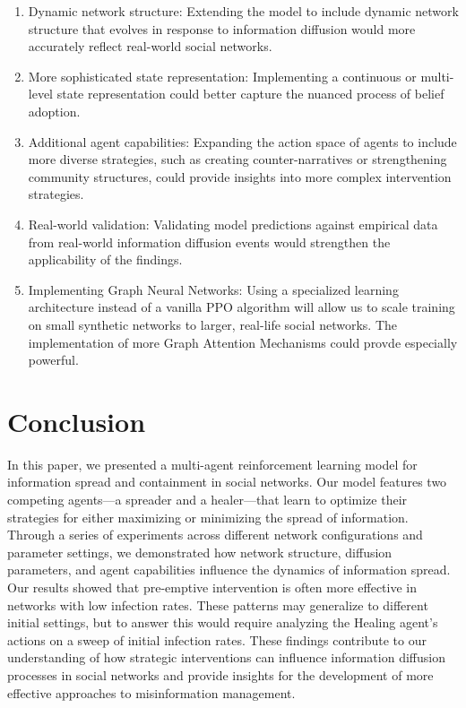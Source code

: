 \documentclass[12pt]{article}
\begin{document}
\begin{enumerate}
    \item Dynamic network structure: Extending the model to include dynamic network structure that evolves in response to information diffusion would more accurately reflect real-world social networks.
    
    \item More sophisticated state representation: Implementing a continuous or multi-level state representation could better capture the nuanced process of belief adoption.
    
    \item Additional agent capabilities: Expanding the action space of agents to include more diverse strategies, such as creating counter-narratives or strengthening community structures, could provide insights into more complex intervention strategies.
    
    \item Real-world validation: Validating model predictions against empirical data from real-world information diffusion events would strengthen the applicability of the findings.

    \item Implementing Graph Neural Networks: Using 
    a specialized learning architecture instead of a vanilla PPO algorithm will allow us to scale training 
    on small synthetic networks to larger, real-life social networks. The implementation of more Graph Attention Mechanisms could provde especially powerful. 
\end{enumerate}

\section{Conclusion}

In this paper, we presented a multi-agent reinforcement learning model for information spread and containment in social networks. Our model features two competing agents—a spreader and a healer—that learn to optimize their strategies for either maximizing or minimizing the spread of information. Through a series of experiments across different network configurations and parameter settings, we demonstrated how network structure, diffusion parameters, and agent capabilities influence the dynamics of information spread.
Our results showed that pre-emptive intervention is often more effective in networks with low infection rates. These patterns may generalize to different initial settings, but to answer this would require analyzing the Healing agent's actions on a sweep of initial infection rates. These findings contribute to our understanding of how strategic interventions can influence information diffusion processes in social networks and provide insights for the development of more effective approaches to misinformation management.
\end{document}
